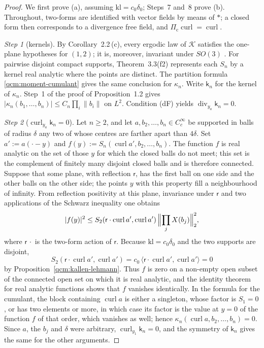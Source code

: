 \documentclass[11pt,letterpaper,reqno]{amsart}
\theoremstyle{definition}
\begin{document}
\begin{proof}
We first prove (a), assuming $\mathrm{kl}=c_0\delta_0$; Steps~7 and~8 prove (b).
Throughout, two-forms are identified with vector fields by means of $\ast$; a closed form then corresponds to a divergence free field, and $\Pi_{\mathrm c}\operatorname{curl}=\operatorname{curl}$.

\emph{Step 1} (kernels).
By Corollary~2.2\,(c), every ergodic law of $\mathcal K$ satisfies the one-plane hypotheses for $(1,2)$; it is, moreover, invariant under $SO(3)$ \cite[Theorem~8.6]{QEDConstruction}.
For pairwise disjoint compact supports, Theorem~3.3(f2) represents each $S_n$ by a kernel real analytic where the points are distinct. The partition formula \eqref{qcm:moment-cumulant} gives the same conclusion for $\kappa_n$.
Write $\mathsf k_n$ for the kernel of $\kappa_n$.
Step~1 of the proof of Proposition~1.2 gives $|\kappa_n(b_1,\dots,b_n)|\le C_n\prod_i\|b_i\|$ on $L^2$.
Condition (dF) yields $\operatorname{div}_{y_a}\mathsf k_n=0$.

\emph{Step 2} ($\operatorname{curl}_{y_a}\mathsf k_n=0$).
Let $n\ge2$, and let $a,b_2,\dots,b_n\in C_c^\infty$ be supported in balls of radius $\delta$ any two of whose centres are farther apart than $4\delta$.
Set $a':=a(\cdot-y)$ and $f(y):=S_n(\operatorname{curl}a',b_2,\dots,b_n)$.
The function $f$ is real analytic on the set of those $y$ for which the closed balls do not meet; this set is the complement of finitely many disjoint closed balls and is therefore connected.
Suppose that some plane, with reflection $\mathsf r$, has the first ball on one side and the other balls on the other side; the points $y$ with this property fill a neighbourhood of infinity.
From reflection positivity at this plane, invariance under $\mathsf r$ \cite[Theorem~8.6]{QEDConstruction} and two applications of the Schwarz inequality one obtains
\begin{equation*}
|f(y)|^2\le S_2(\mathsf r\cdot\operatorname{curl}a',\operatorname{curl}a')\,\Bigl\|\prod_jX(b_j)\Bigr\|_2^2,
\end{equation*}
where $\mathsf r\,\cdot$ is the two-form action of $\mathsf r$.
Because $\mathrm{kl}=c_0\delta_0$ and the two supports are disjoint,
\begin{equation*}
S_2(\mathsf r\cdot\operatorname{curl}a',\operatorname{curl}a')=c_0\,\langle\mathsf r\cdot\operatorname{curl}a',\operatorname{curl}a'\rangle=0
\end{equation*}
by Proposition~\ref{qcm:kallen-lehmann}.
Thus $f$ is zero on a non-empty open subset of the connected open set on which it is real analytic, and the identity theorem for real analytic functions \cite[Section~8.3 and Proposition~8.3]{QEDConstruction} shows that $f$ vanishes identically.
In the formula for the cumulant, the block containing $\operatorname{curl}a$ is either a singleton, whose factor is $S_1=0$, or has two elements or more, in which case its factor is the value at $y=0$ of the function $f$ of that order, which vanishes as well; hence $\kappa_n(\operatorname{curl}a,b_2,\dots,b_n)=0$.
Since $a$, the $b_j$ and $\delta$ were arbitrary, $\operatorname{curl}_{y_1}\mathsf k_n=0$, and the symmetry of $\mathsf k_n$ gives the same for the other arguments.


\end{proof}
\end{document}
